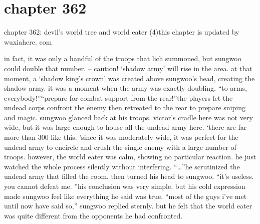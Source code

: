 \section{chapter 362}

chapter 362: devil’s world tree and world eater (4)this chapter is updated by wuxiahere.
com




in fact, it was only a handful of the troops that lich summoned, but sungwoo could double that number.
– caution! ‘shadow army’ will rise in the area.
at that moment, a ‘shadow king’s crown’ was created above sungwoo’s head, creating the shadow army.
it was a moment when the army was exactly doubling.
“to arms, everybody!”“prepare for combat support from the rear!”the players let the undead corps confront the enemy then retreated to the rear to prepare sniping and magic.
sungwoo glanced back at his troops.
 victor’s cradle here was not very wide, but it was large enough to house all the undead army here.
‘there are far more than 300 like this.
’since it was moderately wide, it was perfect for the undead army to encircle and crush the single enemy with a large number of troops.
however, the world eater was calm, showing no particular reaction.
 he just watched the whole process silently without interfering.
“…”he scrutinized the undead army that filled the room, then turned his head to sungwoo.
“it’s useless.
 you cannot defeat me.
”his conclusion was very simple.
 but his cold expression made sungwoo feel like everything he said was true.
“most of the guys i’ve met until now have said so,” sungwoo replied sternly.
but he felt that the world eater was quite different from the opponents he had confronted.

